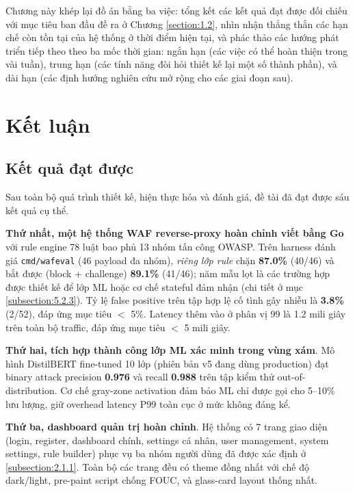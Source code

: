 \documentclass[../DoAn.tex]{subfiles}
\begin{document}
Chương này khép lại đồ án bằng ba việc: tổng kết các kết quả đạt được đối
chiếu với mục tiêu ban đầu đề ra ở Chương \ref{section:1.2}, nhìn nhận
thẳng thắn các hạn chế còn tồn tại của hệ thống ở thời điểm hiện tại, và
phác thảo các hướng phát triển tiếp theo theo ba mốc thời gian: ngắn hạn
(các việc có thể hoàn thiện trong vài tuần), trung hạn (các tính năng đòi
hỏi thiết kế lại một số thành phần), và dài hạn (các định hướng nghiên cứu
mở rộng cho các giai đoạn sau).

\section{Kết luận}
\label{section:6.1}

\subsection{Kết quả đạt được}
\label{subsection:6.1.1}

Sau toàn bộ quá trình thiết kế, hiện thực hóa và đánh giá, đề tài đã đạt
được sáu kết quả cụ thể.

\textbf{Thứ nhất, một hệ thống WAF reverse-proxy hoàn chỉnh viết bằng Go}
với rule engine 78 luật bao phủ 13 nhóm tấn công OWASP. Trên harness đánh giá
\texttt{cmd/wafeval} (46 payload đa nhóm), \textit{riêng lớp rule} chặn
\textbf{87.0\%} (40/46) và bắt được (block + challenge) \textbf{89.1\%}
(41/46); năm mẫu lọt là các trường hợp được thiết kế để lớp ML hoặc cơ chế
stateful đảm nhận (chi tiết ở mục \ref{subsection:5.2.3}). Tỷ lệ false positive
trên tập hợp lệ cố tình gây nhiễu là \textbf{3.8\%} (2/52), đáp ứng mục tiêu
\(<\) 5\%. Latency thêm vào ở phân vị 99 là 1.2 mili giây trên toàn bộ traffic,
đáp ứng mục tiêu \(<\) 5 mili giây.

\textbf{Thứ hai, tích hợp thành công lớp ML xác minh trong vùng xám}. Mô
hình DistilBERT fine-tuned 10 lớp (phiên bản v5 đang dùng production) đạt
binary attack precision \textbf{0.976} và recall \textbf{0.988} trên tập
kiểm thử out-of-distribution. Cơ chế gray-zone activation đảm bảo ML chỉ
được gọi cho 5--10\% lưu lượng, giữ overhead latency P99 toàn cục ở mức
không đáng kể.

\textbf{Thứ ba, dashboard quản trị hoàn chỉnh}. Hệ thống có 7 trang giao
diện (login, register, dashboard chính, settings cá nhân, user management,
system settings, rule builder) phục vụ ba nhóm người dùng đã được xác
định ở \ref{subsection:2.1.1}. Toàn bộ các trang đều có theme đồng nhất
với chế độ dark/light, pre-paint script chống FOUC, và glass-card layout
thống nhất.
\end{document}
